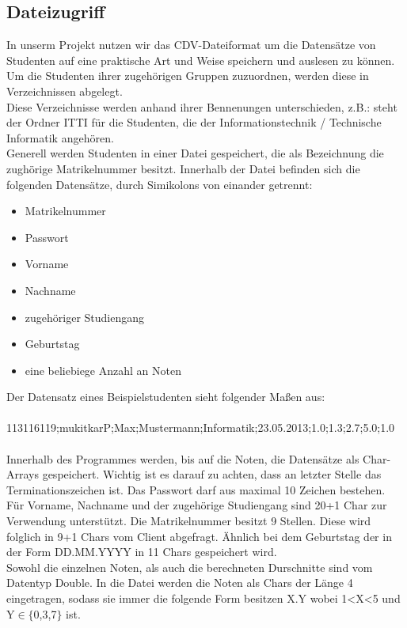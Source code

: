 \documentclass{scrartcl}
\begin{document}
	\subsection{Dateizugriff}
		In unserm Projekt nutzen wir das CDV-Dateiformat um die Datensätze von Studenten auf eine praktische Art und Weise speichern und auslesen zu können. Um die Studenten ihrer zugehörigen Gruppen zuzuordnen, werden diese in Verzeichnissen abgelegt.\\
		Diese Verzeichnisse werden anhand ihrer Bennenungen unterschieden, z.B.: steht der Ordner ITTI für die Studenten, die der Informationstechnik / Technische Informatik angehören.\\
		Generell werden Studenten in einer Datei gespeichert, die als Bezeichnung die zughörige Matrikelnummer besitzt. Innerhalb der Datei befinden sich die folgenden Datensätze, durch Simikolons von einander getrennt:\\
		\begin{itemize}
			\item Matrikelnummer
			\item Passwort
			\item Vorname
			\item Nachname
			\item zugehöriger Studiengang
			\item Geburtstag
			\item eine beliebiege Anzahl an Noten
		\end{itemize}
		Der Datensatz eines Beispielstudenten sieht folgender Maßen aus:\\
		 \\
		113116119;mukitkarP;Max;Mustermann;Informatik;23.05.2013;1.0;1.3;2.7;5.0;1.0\\
		 \\
		Innerhalb des Programmes werden, bis auf die Noten, die Datensätze als Char-Arrays gespeichert. Wichtig ist es darauf zu achten, dass an letzter Stelle das Terminationszeichen ist. Das Passwort darf aus maximal 10 Zeichen bestehen. Für Vorname, Nachname und der zugehörige Studiengang sind 20+1 Char zur Verwendung unterstützt. Die Matrikelnummer besitzt 9 Stellen. Diese wird folglich in 9+1 Chars vom Client abgefragt. Ähnlich bei dem Geburtstag der in der Form DD.MM.YYYY in 11 Chars gespeichert wird. \\
		Sowohl die einzelnen Noten, als auch die berechneten Durschnitte sind vom Datentyp Double. In die Datei werden die Noten als Chars der Länge 4 eingetragen, sodass sie immer die folgende Form besitzen X.Y wobei 1<X<5 und Y$\in \{$0,3,7$\}$ ist.\\
\end{document}
